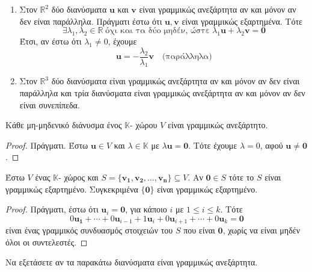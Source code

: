 \begin{examples}
\item {}
  \begin{enumerate}
    \item Στον $ \mathbb{R}^{2} $ δύο διανύσματα $ \mathbf{u} $ και $ \mathbf{v} $ 
      είναι γραμμικώς ανεξάρτητα αν και μόνον αν δεν είναι παράλληλα. Πράγματι 
      έστω ότι $ \mathbf{u}, \mathbf{v} $ είναι γραμμικώς εξαρτημένα. Τότε 
      \[
        \exists \lambda _{1}, \lambda _{2} \in \mathbb{R} \; 
        \text{όχι και τα δύο μηδέν, ώστε} 
        \; \lambda_{1} \mathbf{u} + \lambda_{2} \mathbf{v} = \mathbf{0} 
      \]
      Έτσι, αν έστω ότι $ \lambda_{1} \neq 0 $, έχουμε 
      \[
        \mathbf{u} = - \frac{\lambda _{2}}{\lambda _{1}} \mathbf{v} \quad  
        \text{(παράλληλα)}
      \] 

    \item Στον $ \mathbb{R}^{3} $ δύο διανύσματα είναι γραμμικώς ανεξάρτητα αν και 
      μόνον αν δεν είναι παράλληλα και τρία διανύσματα είναι γραμμικώς ανεξάρτητα αν 
      και μόνον αν δεν είναι συνεπίπεδα.
  \end{enumerate}
\end{examples}


\begin{prop}
  Κάθε μη-μηδενικό διάνυσμα ένος $ \mathbb{K} $- χώρου $V$ είναι γραμμικώς 
  ανεξάρτητο.
\end{prop}
\begin{proof}
  Πράγματι. Έστω $ \mathbf{u} \in V $ και $ \lambda \in \mathbb{K} $ με 
  $ \lambda \mathbf{u} = \mathbf{0} $. Τότε έχουμε $ \lambda = 0 $, αφού 
  $ \mathbf{u} \neq \mathbf{0} $.
\end{proof}

\begin{prop}
  Έστω $V$ ένας $ \mathbb{K} $- χώρος και 
  $ S = \{ \mathbf{v_{1}}, \mathbf{v_{2}}, \ldots, \mathbf{v_{n}}  \} \subseteq V $.
  Αν $ \mathbf{0} \in S $ τότε το $S$ είναι γραμμικώς εξαρτημένο. Συγκεκριμένα 
  $ \{ \mathbf{0} \} $ είναι γραμμικώς εξαρτημένο.
\end{prop}
\begin{proof}
  Πράγματι, έστω ότι $ \mathbf{u}_{i} = \mathbf{0} $, για κάποιο $ i $ με 
  $ 1 \leq i \leq k $. Τότε
  \[
    0 \mathbf{u_{1}}+ \cdots + 0 \mathbf{u}_{i-1} + 1 \mathbf{u}_{i} + 0 
    \mathbf{u}_{i+1} + \cdots + 0 \mathbf{u}_{k} = \mathbf{0}  
  \]
  είναι ένας γραμμικός συνδυασμός στοιχειών του $S$ που είναι $ \mathbf{0} $, 
  χωρίς να είναι μηδέν όλοι οι συντελεστές.
\end{proof}

\begin{exercise}
  Να εξετάσετε αν τα παρακάτω διανύσματα είναι γραμμικώς ανεξάρτητα.
\end{exercise}



